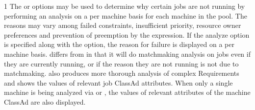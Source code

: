 \begin{ManPage}{\label{man-condor-q}}{1}
The  or  options may be used to determine 
why certain jobs are not
running by performing an analysis on a per machine basis for each machine in 
the pool.  The reasons may vary among failed constraints, insufficient priority,
resource owner preferences and prevention of preemption by the 
 expression.  
If the analyze option  is specified 
along with the  option, the reason for failure is displayed on a 
per machine basis. 
 differs from  in that it will
do matchmaking analysis on jobs even if they are currently running, 
or if the reason they are not running is not due to matchmaking.
 also produces
more thorough analysis of complex Requirements and shows the values of 
relevant job ClassAd attributes.  
When only a single machine is being analyzed via  or
,
the values of relevant attributes of the machine ClassAd are also displayed.


\end{ManPage}
